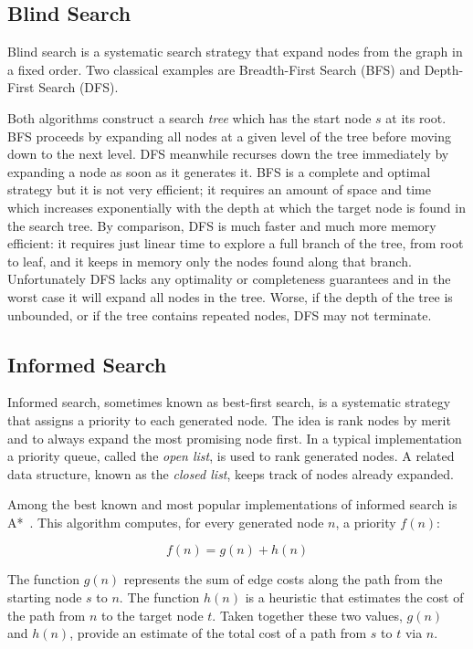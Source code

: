 \subsection{Blind Search}
\label{cha::lit::search::blind}
Blind search is a systematic search strategy that expand nodes from the 
graph in a fixed order. Two classical examples are Breadth-First Search (BFS) and 
Depth-First Search (DFS). 

Both algorithms construct a search \emph{tree} which has the start node $s$ at its root. 
BFS proceeds by expanding all nodes at a given level of the tree
before moving down to the next level. DFS meanwhile recurses down the tree immediately 
by expanding a node as soon as it generates it.
BFS is a complete and optimal strategy but it is not very efficient; it requires
an amount of space and time which increases exponentially with the depth at which 
the target node is found in the search tree.
By comparison, DFS is much faster and much more memory efficient: it requires just
linear time to explore a full branch of the tree, from root to leaf, and it keeps in 
memory only the nodes found along that branch. Unfortunately DFS lacks any optimality or 
completeness guarantees and in the worst case it will expand all nodes in the tree.
Worse, if the depth of the tree is unbounded, or if the tree contains repeated nodes, 
DFS may not terminate.

\subsection{Informed Search}
\label{cha::lit::search::informed}
Informed search, sometimes known as best-first search, is a systematic strategy
that assigns a priority to each generated node. The idea is rank nodes by merit 
and to always expand the most promising node first.
In a typical implementation a priority queue, called the 
\emph{open list}, is used to rank generated nodes. A related data structure, 
known as the \emph{closed list}, keeps track of nodes already expanded.

Among the best known and most popular implementations of informed search is 
A*~\citep{hart68}. This algorithm computes, for every generated node $n$, a 
priority $f(n)$:

\begin{equation}
f(n) = g(n) + h(n)
\end{equation}

The function $g(n)$ represents the sum of edge costs along the path from the
starting node $s$ to $n$. The function $h(n)$ is a heuristic that estimates the
cost of the path from $n$ to the target node $t$.  Taken together these two
values, $g(n)$ and $h(n)$, provide an estimate of the total cost of a path from
$s$ to $t$ via $n$.  

